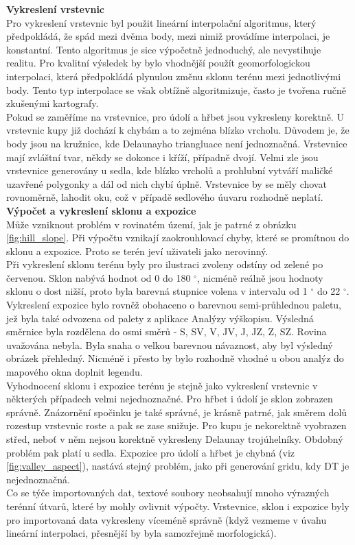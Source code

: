 \documentclass[a4paper,11pt,twoside]{article}
\begin{document}
\noindent\textbf{Vykreslení vrstevnic}\\
\noindent Pro vykreslení vrstevnic byl použit lineární interpolační algoritmus, který předpokládá, že spád mezi dvěma body, mezi nimiž provádíme interpolaci, je konstantní. Tento algoritmus je sice výpočetně jednoduchý, ale nevystihuje realitu. Pro kvalitní výsledek by bylo vhodnější použít geomorfologickou interpolaci, která předpokládá plynulou změnu sklonu terénu mezi jednotlivými body. Tento typ interpolace se však obtížně algoritmizuje, často je tvořena ručně zkušenými kartografy.\\
\indent Pokud se zaměříme na vrstevnice, pro údolí a hřbet jsou vykresleny korektně. U vrstevnic kupy již dochází k chybám a to zejména blízko vrcholu. Důvodem je, že body jsou na kružnice, kde Delaunayho triangluace není jednoznačná. Vrstevnice mají zvláštní tvar, někdy se dokonce i kříží, případně dvojí. Velmi zle jsou vrstevnice generovány u sedla, kde blízko vrcholů a prohlubní vytváří maličké uzavřené polygonky a dál od nich chybí úplně. Vrstevnice by se měly chovat rovnoměrně, lahodit oku, což v případě sedlového úuvaru rozhodně neplatí.\\

\noindent\textbf{Výpočet a vykreslení sklonu a expozice}\\
Může vzniknout problém v rovinatém území, jak je patrné z obrázku \ref{fig:hill_slope}. Při výpočtu vznikají zaokrouhlovací chyby, které se promítnou do sklonu a expozice. Proto se terén jeví uživateli jako nerovinný.\\
\indent Při vykreslení sklonu terénu byly pro ilustraci zvoleny odstíny od zelené po červenou. Sklon nabývá hodnot od 0 do 180 $^\circ$, nicméně reálně jsou hodnoty sklonu o dost nižší, proto byla barevná stupnice volena v intervalu od 1 $^\circ$ do 22 $^\circ$. \\
\indent Vykreslení expozice bylo rovněž obohaceno o barevnou semi-průhlednou paletu, jež byla také odvozena od palety z aplikace Analýzy výškopisu. Výsledná směrnice byla rozdělena do osmi směrů - S, SV, V, JV, J, JZ, Z, SZ. Rovina uvažována nebyla. Byla snaha o velkou barevnou návaznost, aby byl výsledný obrázek přehledný. Nicméně i přesto by bylo rozhodně vhodné u obou analýz do mapového okna doplnit legendu. \\
\indent Vyhodnocení sklonu i expozice terénu je stejně jako vykreslení vrstevnic v některých případech velmi nejednoznačné. Pro hřbet i údolí je sklon zobrazen správně. Znázornění spočinku je také správné, je krásně patrné, jak směrem dolů rozestup vrstevnic roste a pak se zase snižuje. Pro kupu je nekorektně vyobrazen střed, neboť v něm nejsou korektně vykresleny Delaunay trojúhelníky. Obdobný problém pak platí u sedla. Expozice pro údolí a hřbet je chybná (viz \ref{fig:valley_aspect}), nastává stejný problém, jako při generování gridu, kdy DT je nejednoznačná. \\
Co se týče importovaných dat, textové soubory neobsahují mnoho výrazných terénní útvarů, které by mohly ovlivnit výpočty. Vrstevnice, sklon i expozice byly pro importovaná data vykresleny víceméně správně (když vezmeme v úvahu lineární interpolaci, přesnější by byla samozřejmě morfologická). 
\end{document}
